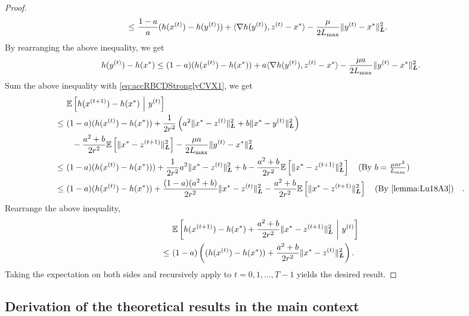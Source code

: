 \begin{proof}
\begin{align*}
    ~\leq~ & \frac{1-a}{a}( h( x^{(t)} ) - h(y^{(t)}) ) + \langle \nabla h( y^{(t)} ), z^{(t)} - x^* \rangle - \frac{\mu}{2L_{\max}} \| y^{(t)} - x^* \|^2_{\boldsymbol{L}}.
\end{align*}
By rearranging the above inequality, we get
\begin{align*}
    h( y^{(t)} ) - h(x^*) \leq (1-a) ( h( x^{(t)} ) - h(x^*) ) + a \langle \nabla h( y^{(t)} ), z^{(t)} - x^* \rangle - \frac{\mu a}{2L_{\max}} \| y^{(t)} - x^* \|^2_{\boldsymbol{L}}.
\end{align*}
Sum the above inequality with \eqref{eq:accRBCDStronglyCVX1}, we get
\begin{align*}
    &\mE \left[ h( x^{(t+1)} ) - h(x^*) ~\Big|~ y^{(t)}  \right] \\
    \leq~& (1-a) ( h( x^{(t)} ) - h(x^{*}) ) + \frac{1}{2r^2} \left( a^2 \| x^* - z^{(t)} \|_{\bL}^2 + b \| x^* - y^{(t)} \|_{\bL}^2 \right)  \\
    &~~ - \frac{a^2 + b}{2r^2} \mE \left[  \| x^* - z^{(t+1)} \|_{\bL}^2 \right] - \frac{\mu a}{2L_{\max}} \| y^{(t)} - x^* \|^2_{\bL} \\
    \leq~& (1-a) ( h( x^{(t)} ) - h(x^{*}) ) ) + \frac{1}{2r^2}  a^2 \| x^* - z^{(t)} \|_{\bL}^2 + b - \frac{a^2 + b}{2r^2} \mE \left[  \| x^* - z^{(t+1)} \|_{\bL}^2 \right] \text{(By $b = \frac{\mu a r^2}{L_{\max}}$)} \\
    \leq~& (1-a) ( h( x^{(t)} ) - h(x^{*}) ) + \frac{(1-a)(a^2+b)}{2r^2}  \| x^* - z^{(t)} \|_{\bL}^2 - \frac{a^2 + b}{2r^2} \mE \left[  \| x^* - z^{(t+1)} \|_{\bL}^2 \right] \text{(By \autoref{lemma:Lu18A3})}.
\end{align*}
Rearrange the above inequality,
\begin{align*}
    & \mathbb{E} \left[ h( x^{(t+1)} ) - h(x^*) + \frac{a^2 + b}{2r^2}  \| x^* - z^{(t+1)} \|_{\boldsymbol{L}}^2  ~\bigg|~ y^{(t)}   \right] \\
    \leq~& (1-a) \left( ( h( x^{(t)} ) - h(x^{*}) ) + \frac{a^2+b}{2r^2}  \| x^* - z^{(t)} \|_{\boldsymbol{L}}^2 \right).
\end{align*}
Taking the expectation on both sides and recursively apply to $t = 0, 1, \ldots, T-1$ yields the desired result.
\end{proof}

\subsection{Derivation of the theoretical results in the main context} \label{appendix:derivation_main_context}

